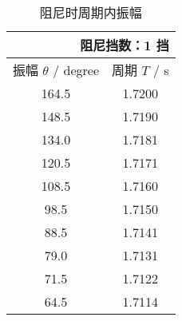 \documentclass[12pt]{ctexart}
\begin{document}
    \begin{table}[hp]
        \centering
        \caption{阻尼时周期内振幅}
        \label{}
        \begin{tabular}{|c|c|}
            \multicolumn{2}{r}{\small 阻尼挡数：1 挡} \\ \hline
            振幅 $\theta$ / degree & 周期 $T$ / s \\ \hline
            164.5 & 1.7200 \\ \hline
            148.5 & 1.7190 \\ \hline
            134.0 & 1.7181 \\ \hline
            120.5 & 1.7171 \\ \hline
            108.5 & 1.7160 \\ \hline
            98.5 & 1.7150 \\ \hline
            88.5 & 1.7141 \\ \hline
            79.0 & 1.7131 \\ \hline
            71.5 & 1.7122 \\ \hline
            64.5 & 1.7114 \\ \hline
        \end{tabular}
    \end{table}
\end{document}
